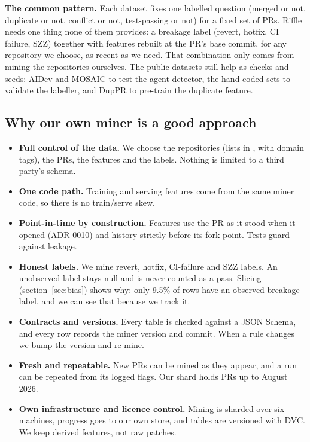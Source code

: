 \documentclass[11pt,a4paper]{article}
\newcommand{\code}[1]{\texttt{\detokenize{#1}}}
\begin{document}
\textbf{The common pattern.} Each dataset fixes one labelled question (merged or not, duplicate or not, conflict or not, test-passing or not) for a fixed set of PRs. Riffle needs one thing none of them provides: a breakage label (revert, hotfix, CI failure, SZZ) together with features rebuilt at the PR's base commit, for any repository we choose, as recent as we need. That combination only comes from mining the repositories ourselves. The public datasets still help as checks and seeds: AIDev and MOSAIC to test the agent detector, the hand-coded sets to validate the labeller, and DupPR to pre-train the duplicate feature.

\subsection{Why our own miner is a good approach}
\begin{itemize}
  \item \textbf{Full control of the data.} We choose the repositories (lists in \code{repos*.txt}, with domain tags), the PRs, the features and the labels. Nothing is limited to a third party's schema.
  \item \textbf{One code path.} Training and serving features come from the same miner code, so there is no train/serve skew.
  \item \textbf{Point-in-time by construction.} Features use the PR as it stood when it opened (ADR 0010) and history strictly before its fork point. Tests guard against leakage.
  \item \textbf{Honest labels.} We mine revert, hotfix, CI-failure and SZZ labels. An unobserved label stays null and is never counted as a pass. Slicing (section~\ref{sec:bias}) shows why: only 9.5\% of rows have an observed breakage label, and we can see that because we track it.
  \item \textbf{Contracts and versions.} Every table is checked against a JSON Schema, and every row records the miner version and commit. When a rule changes we bump the version and re-mine.
  \item \textbf{Fresh and repeatable.} New PRs can be mined as they appear, and a run can be repeated from its logged flags. Our shard holds PRs up to August 2026.
  \item \textbf{Own infrastructure and licence control.} Mining is sharded over six machines, progress goes to our own store, and tables are versioned with DVC. We keep derived features, not raw patches.
\end{itemize}
\end{document}
